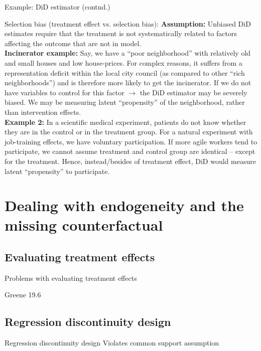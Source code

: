 \documentclass{beamer}
\begin{document}
\begin{frame}{Example: DiD estimator (contnd.)}
\begin{block}{Selection bias (treatment effect vs. selection bias):}
\small
\textbf{Assumption:} Unbiased DiD estimates require that the treatment is not systematically related to factors affecting the outcome that are not in model.  \\
\medskip
\textbf{Incinerator example:} Say, we have a “poor neighborhood” with relatively old and small houses and low house-prices. For complex reasons, it suffers from a representation deficit within the local city council (as compared to other “rich neighborhoods”) and is therefore more likely to get the incinerator. If we do not have variables to control for this factor $\rightarrow$ the DiD estimator may be severely biased. We may be measuring latent ``propensity'' of the neighborhood, rather than intervention effects. \\
\medskip
\textbf{Example 2:} In a scientific medical experiment, patients do not know whether they are in the control or in the treatment group. For a natural experiment with job-training effects, we have voluntary participation. If more agile workers tend to participate, we cannot assume treatment and control group are identical -- except for the treatment. Hence, instead/besides of treatment effect, DiD would measure latent ``propensity'' to participate.
\end{block}
\end{frame}
\section{Dealing with endogeneity and the missing counterfactual}
\subsection{Evaluating treatment effects}
\begin{frame}{Problems with evaluating treatment effects}
    
    Greene 19.6
    
\end{frame}
\subsection{Regression discontinuity design}
\begin{frame}{Regression discontinuity design}
    Violates common support assumption
\end{frame}
\end{document}
